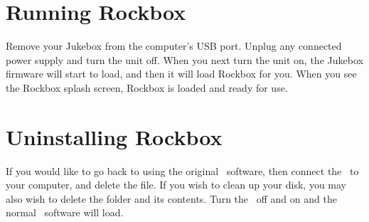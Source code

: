 \section{Running Rockbox}
Remove your Jukebox from the computer's USB port. Unplug any connected power supply and turn the unit off. When you next turn the unit on, the Jukebox firmware will start to load, and then it will load Rockbox for you. When you see the Rockbox splash screen, Rockbox is loaded and ready for use.

\section{Uninstalling Rockbox}
If you would like to go back to using the original \playername\ software, then
connect the \playername\ to your computer, and delete the \fname{\firmwarefilename} file. If you wish to clean up your disk, you may also wish to delete the  folder and its contents. Turn the \playername\ off and on and the normal \playername\ software will load.
